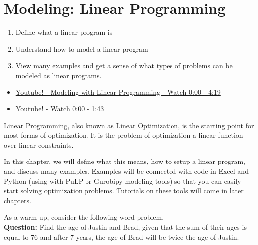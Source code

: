 
\chapter{Modeling: Linear Programming}
\begin{outcome}
\begin{enumerate}
\item Define what a linear program is
\item Understand how to model a linear program
\item View many examples and get a sense of what types of problems can be modeled as linear programs.
\end{enumerate}
\end{outcome}
\begin{resource}
\begin{itemize}
\item \href{https://www.youtube.com/watch?v=K7TL5NMlKIk&ab_channel=Dr.TreforBazett}{Youtube! - Modeling with Linear Programming - Watch 0:00 - 4:19}
\item \href{https://www.youtube.com/watch?v=E72DWgKP_1Y&t=1014s&ab_channel=TomS}{Youtube! - Watch 0:00 - 1:43}
\end{itemize}
\end{resource}


Linear Programming, also known as Linear Optimization, is the starting point for most forms of optimization.  It is the problem of optimization a linear function over linear constraints.   

In this chapter, we will define what this means, how to setup a linear program, and discuss many examples.   Examples will be connected with code in Excel and Python (using with PuLP or Gurobipy modeling tools) so that you can easily start solving optimization problems.   Tutorials on these tools will come in later chapters.

As a warm up, consider the following word problem.\\
\noindent \textbf{Question:} Find the age of Justin and Brad, given that the sum of their ages is equal to 76 and after 7 years, the age of Brad will be twice the age of Justin.


